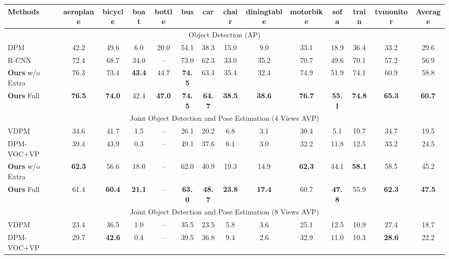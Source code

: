\documentclass[10pt,twocolumn,letterpaper]{article}
\begin{document}
\begin{table*}\setlength{\tabcolsep}{5pt}
	\tiny
	\centering
	\begin{tabular}{|l||c|c|c|c|c|c|c|c|c|c|c|c||c|}
		\hline
		Methods & aeroplane & bicycle & boat & bottle & bus & car & chair & diningtable & motorbike & sofa & train & tvmonitor & Average\\
		\hline
		\hline \multicolumn{14}{|c|}{Object Detection (AP)} \\
		\hline DPM \cite{felzenszwalb2010object} & 42.2 & 49.6 & 6.0 & 20.0 & 54.1 & 38.3 & 15.0 & 9.0 & 33.1 & 18.9 & 36.4 & 33.2 & 29.6 \\
		\hline R-CNN \cite{girshick2013rich} & 72.4 & 68.7 & 34.0 & -- & 73.0 & 62.3 & 33.0 & 35.2 & 70.7 & 49.6 & 70.1 & 57.2 & 56.9 \\
		\hline \textbf{Ours} w/o Extra & 76.3 & 73.4 & \textbf{43.4} & 44.7 & \textbf{74.5} & 63.3 & 35.4 & 32.4 & 74.9 & 51.9 & 74.1 & 60.9 & 58.8 \\
		\hline \textbf{Ours} Full & \textbf{76.5} & \textbf{74.0} & 42.4 & \textbf{47.0} & \textbf{74.5} & \textbf{64.7} & \textbf{38.5} & \textbf{38.6} & \textbf{76.7} & \textbf{55.1} &  \textbf{74.8} & \textbf{65.3} & \textbf{60.7} \\
		\hline
		\hline \multicolumn{14}{|c|}{Joint Object Detection and Pose Estimation (4 Views AVP)} \\
		\hline VDPM \cite{xiang2014beyond} & 34.6 & 41.7 & 1.5 & -- & 26.1 & 20.2 & 6.8 & 3.1 & 30.4 & 5.1 & 10.7 & 34.7 & 19.5 \\		
		\hline DPM-VOC+VP \cite{bojan15pami} & 39.4 & 43.9 & 0.3 & -- & 49.1 & 37.6 & 6.1 & 3.0 & 32.2 & 11.8 & 12.5 & 33.2 & 24.5 \\
		\hline \textbf{Ours} w/o Extra & \textbf{62.3} & 56.6 & 18.0 & -- & 62.0 & 40.9 & 19.3 & 14.9 & \textbf{62.3} & 44.1 & \textbf{58.1} & 58.5 & 45.2  \\
		\hline \textbf{Ours} Full & 61.4 & \textbf{60.4} & \textbf{21.1} & -- & \textbf{63.0} & \textbf{48.7} & \textbf{23.8} & \textbf{17.4} & 60.7 & \textbf{47.8} & 55.9 & \textbf{62.3} & \textbf{47.5} \\
		\hline
		\hline \multicolumn{14}{|c|}{Joint Object Detection and Pose Estimation (8 Views AVP)} \\
		\hline VDPM \cite{xiang2014beyond} & 23.4 & 36.5 & 1.0 & -- & 35.5 & 23.5 & 5.8 & 3.6 & 25.1 & 12.5 & 10.9 & 27.4 & 18.7 \\		
		\hline DPM-VOC+VP \cite{bojan15pami} & 29.7 & \textbf{42.6} & 0.4 & -- & 39.5 & 36.8 & 9.4 & 2.6 & 32.9 & 11.0 & 10.3 & \textbf{28.6} & 22.2 \\

\end{tabular}
\end{table*}
\end{document}
